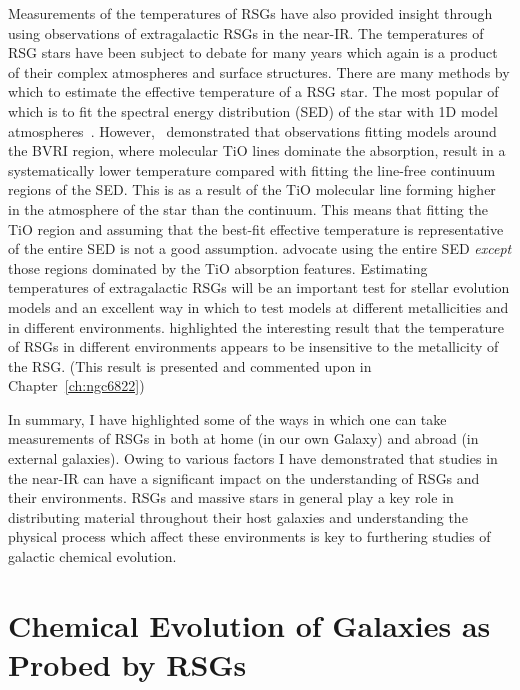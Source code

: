 Measurements of the temperatures of RSGs have also provided insight through using observations of extragalactic RSGs in the near-IR.
The temperatures of RSG stars have been subject to debate for many years which again is a product of their complex atmospheres and surface structures.
There are many methods by which to estimate the effective temperature of a RSG star.
The most popular of which is to fit the spectral energy distribution (SED) of the star with 1D model atmospheres~\citep{Levesque05,Levesque06}.
However,~\cite{2013ApJ...767....3D} demonstrated that observations fitting models around the BVRI region, where molecular TiO lines dominate the absorption, result in a systematically lower temperature compared with fitting the line-free continuum regions of the SED.
This is as a result of the TiO molecular line forming higher in the atmosphere of the star than the continuum.
This means that fitting the TiO region and assuming that the best-fit effective temperature is representative of the entire SED is not a good assumption.
\cite{2013ApJ...767....3D} advocate using the entire SED \textit{except} those regions dominated by the TiO absorption features.
Estimating temperatures of extragalactic RSGs will be an important test for stellar evolution models and an excellent way in which to test models at different metallicities and in different environments.
\cite{2015ApJ...803...14P} highlighted the interesting result that the temperature of RSGs in different environments appears to be insensitive to the metallicity of the RSG. (This result is presented and commented upon in Chapter~\ref{ch:ngc6822})

In summary, I have highlighted some of the ways in which one can take measurements of RSGs in both at home (in our own Galaxy) and abroad (in external galaxies).
Owing to various factors I have demonstrated that studies in the near-IR can have a significant impact on the understanding of RSGs and their environments.
RSGs and massive stars in general play a key role in distributing material throughout their host galaxies and understanding the physical process which affect these environments is key to furthering studies of galactic chemical evolution.




\section{Chemical Evolution of Galaxies as Probed by RSGs} %
\label{sec:chemical evolution}



